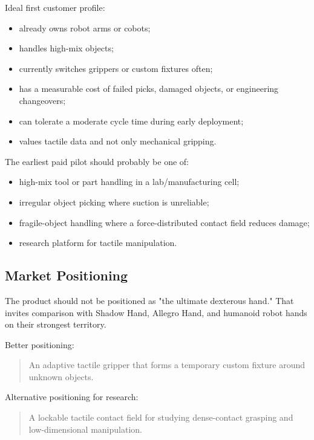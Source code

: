 \documentclass[11pt]{article}
\begin{document}
Ideal first customer profile:

\begin{itemize}[leftmargin=*]
  \item already owns robot arms or cobots;
  \item handles high-mix objects;
  \item currently switches grippers or custom fixtures often;
  \item has a measurable cost of failed picks, damaged objects, or engineering changeovers;
  \item can tolerate a moderate cycle time during early deployment;
  \item values tactile data and not only mechanical gripping.
\end{itemize}

The earliest paid pilot should probably be one of:

\begin{itemize}[leftmargin=*]
  \item high-mix tool or part handling in a lab/manufacturing cell;
  \item irregular object picking where suction is unreliable;
  \item fragile-object handling where a force-distributed contact field reduces damage;
  \item research platform for tactile manipulation.
\end{itemize}

\subsection{Market Positioning}

The product should not be positioned as "the ultimate dexterous hand." That invites comparison with Shadow Hand, Allegro Hand, and humanoid robot hands on their strongest territory.

Better positioning:

\begin{quote}
An adaptive tactile gripper that forms a temporary custom fixture around unknown objects.
\end{quote}

Alternative positioning for research:

\begin{quote}
A lockable tactile contact field for studying dense-contact grasping and low-dimensional manipulation.
\end{quote}
\end{document}
